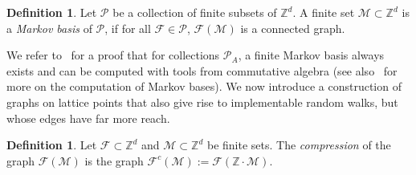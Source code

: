 \documentclass[11pt]{amsart}
\theoremstyle{definition}
\newtheorem{defn}[thm]{Definition}
\numberwithin{equation}{section}
\newcommand{\ring}[1]{\ensuremath{\mathbb{#1}}}
\renewcommand{\>}{\rangle}
\newcommand{\<}{\langle}
\newcommand{\0}{\mathbf{0}}
\newcommand{\1}{\mathbf{1}}
\newcommand{\2}{\mathbf{2}}
\newcommand\ZZ{\ring{Z}}
\newcommand\cF{{\mathcal F}}
\newcommand\cM{{\mathcal M}}
\newcommand\cP{{\mathcal P}}
\begin{document}
\begin{defn}\label{d:Markovbasis}
Let $\cP$ be a collection of finite subsets of $\ZZ^d$. A finite set
$\cM\subset\ZZ^d$ is a \emph{Markov basis} of $\cP$, if for all
$\cF\in\cP$, $\cF(\cM)$ is a connected graph. 
\end{defn}

We refer to~\cite[Theorem~3.1]{Diaconis1998a} for a proof that for collections $\cP_A$,
a finite Markov basis always exists and can be computed with tools
from commutative algebra (see also~\cite{hemmecke2005} for more on the
computation of Markov bases).  We now introduce a construction of
graphs on lattice points that also give rise to implementable random
walks, but whose edges have far more reach.

\begin{defn}\label{d:CompressedFibergraph}
Let $\cF\subset\ZZ^d$ and $\cM\subset\ZZ^d$ be finite sets. The
\emph{compression} of the graph $\cF(\cM)$ is the graph
$\cF^c(\cM):=\cF(\ZZ\cdot\cM)$.
\end{defn}
\end{document}
